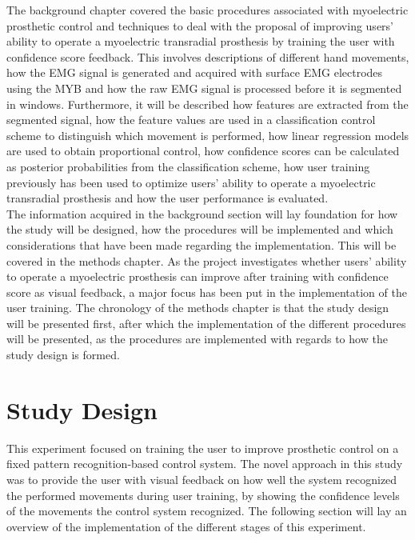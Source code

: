 The background chapter covered the basic procedures associated with myoelectric prosthetic control and techniques to deal with the proposal of improving users' ability to operate a myoelectric transradial prosthesis by training the user with confidence score feedback. This involves descriptions of different hand movements, how the EMG signal is generated and acquired with surface EMG electrodes using the MYB and how the raw EMG signal is processed before it is segmented in windows. Furthermore, it will be described how features are extracted from the segmented signal, how the feature values are used in a classification control scheme to distinguish which movement is performed, how linear regression models are used to obtain proportional control, how confidence scores can be calculated as posterior probabilities from the classification scheme, how user training previously has been used to optimize users' ability to operate a myoelectric transradial prosthesis and how the user performance is evaluated. \\
The information acquired in the background section will lay foundation for how the study will be designed, how the procedures will be implemented and which considerations that have been made regarding the implementation. This will be covered in the methods chapter. As the project investigates whether users' ability to operate a myoelectric prosthesis can improve after training with confidence score as visual feedback, a major focus has been put in the implementation of the user training. The chronology of the methods chapter is that the study design will be presented first, after which the implementation of the different procedures will be presented, as the procedures are implemented with regards to how the study design is formed. 

\section{Study Design} \label{sec:M:studyDesign}

This experiment focused on training the user to improve prosthetic control on a fixed pattern recognition-based control system. The novel approach in this study was to provide the user with visual feedback on how well the system recognized the performed movements during user training, by showing the confidence levels of the movements the control system recognized. The following section will lay an overview of the implementation of the different stages of this experiment.

